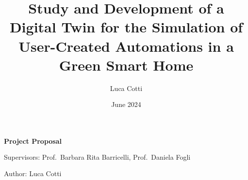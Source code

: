 \documentclass[a4paper,10pt]{article} %
\title{Study and Development of a Digital Twin for the Simulation of User-Created Automations in a Green Smart Home}
\author{Luca Cotti}
\date{June 2024}
\begin{document}

\begin{titlepage}
    \begin{center}
        \Large{\textbf{Project Proposal }}\\
        
        \vspace{4mm}
    
        \normalsize{Supervisors: Prof.\ Barbara Rita Barricelli, Prof.\ Daniela Fogli}\\
        
        \vspace{2mm}
    
        \normalsize{Author: Luca Cotti}\\
    \end{center}
\end{titlepage}



\printbibliography[heading=bibintoc] %
\end{document}
